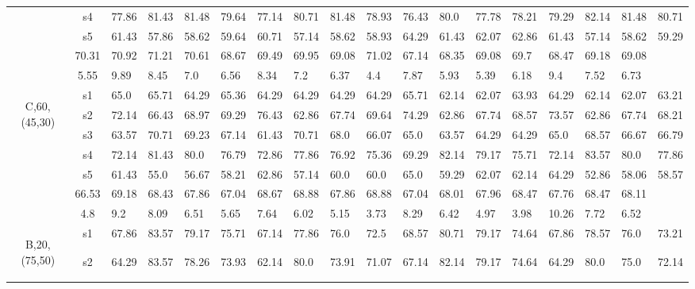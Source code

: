 \begin{table}[h]
{\begin{tabular}{cc|llll|llll|llll|llll}
 & s4 & 77.86 & 81.43 & 81.48 & 79.64 & 77.14 & 80.71 & 81.48 & 78.93 & 76.43 & 80.0 & 77.78 & 78.21 & 79.29 & 82.14 & 81.48 & 80.71 \\
 & s5 & 61.43 & 57.86 & 58.62 & 59.64 & 60.71 & 57.14 & 58.62 & 58.93 & 64.29 & 61.43 & 62.07 & 62.86 & 61.43 & 57.14 & 58.62 & 59.29 \\
\rowcolor{lightgray!50}\multicolumn{2}{r|}{avg} & 70.31 & 70.92 & 71.21 & 70.61 & 68.67 & 69.49 & 69.95 & 69.08 & 71.02 & 67.14 & 68.35 & 69.08 & 69.7 & 68.47 & 69.18 & 69.08 \\
\rowcolor{lightgray!50}\multicolumn{2}{r|}{std} & 5.55 & 9.89 & 8.45 & 7.0 & 6.56 & 8.34 & 7.2 & 6.37 & 4.4 & 7.87 & 5.93 & 5.39 & 6.18 & 9.4 & 7.52 & 6.73 \\
\multirow{6}{*}{\begin{sideways}C,60,(45,30)\end{sideways}} & s1 & 65.0 & 65.71 & 64.29 & 65.36 & 64.29 & 64.29 & 64.29 & 64.29 & 65.71 & 62.14 & 62.07 & 63.93 & 64.29 & 62.14 & 62.07 & 63.21 \\
 & s2 & 72.14 & 66.43 & 68.97 & 69.29 & 76.43 & 62.86 & 67.74 & 69.64 & 74.29 & 62.86 & 67.74 & 68.57 & 73.57 & 62.86 & 67.74 & 68.21 \\
 & s3 & 63.57 & 70.71 & 69.23 & 67.14 & 61.43 & 70.71 & 68.0 & 66.07 & 65.0 & 63.57 & 64.29 & 64.29 & 65.0 & 68.57 & 66.67 & 66.79 \\
 & s4 & 72.14 & 81.43 & 80.0 & 76.79 & 72.86 & 77.86 & 76.92 & 75.36 & 69.29 & 82.14 & 79.17 & 75.71 & 72.14 & 83.57 & 80.0 & 77.86 \\
 & s5 & 61.43 & 55.0 & 56.67 & 58.21 & 62.86 & 57.14 & 60.0 & 60.0 & 65.0 & 59.29 & 62.07 & 62.14 & 64.29 & 52.86 & 58.06 & 58.57 \\
\rowcolor{lightgray!50}\multicolumn{2}{r|}{avg} & 66.53 & 69.18 & 68.43 & 67.86 & 67.04 & 68.67 & 68.88 & 67.86 & 68.88 & 67.04 & 68.01 & 67.96 & 68.47 & 67.76 & 68.47 & 68.11 \\
\rowcolor{lightgray!50}\multicolumn{2}{r|}{std} & 4.8 & 9.2 & 8.09 & 6.51 & 5.65 & 7.64 & 6.02 & 5.15 & 3.73 & 8.29 & 6.42 & 4.97 & 3.98 & 10.26 & 7.72 & 6.52 \\
\multirow{6}{*}{\begin{sideways}B,20,(75,50)\end{sideways}} & s1 & 67.86 & 83.57 & 79.17 & 75.71 & 67.14 & 77.86 & 76.0 & 72.5 & 68.57 & 80.71 & 79.17 & 74.64 & 67.86 & 78.57 & 76.0 & 73.21 \\
 & s2 & 64.29 & 83.57 & 78.26 & 73.93 & 62.14 & 80.0 & 73.91 & 71.07 & 67.14 & 82.14 & 79.17 & 74.64 & 64.29 & 80.0 & 75.0 & 72.14 \\

\end{tabular}}
\end{table}
